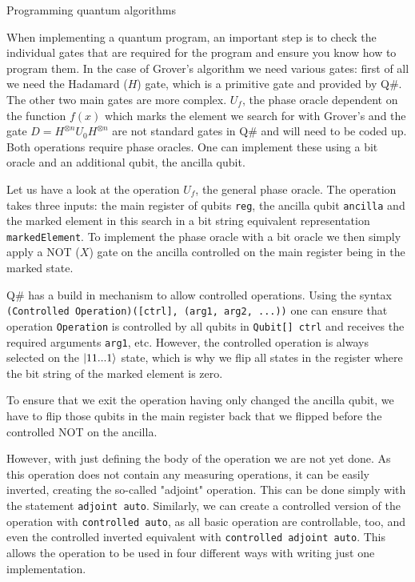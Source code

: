 

Programming quantum algorithms

When implementing a quantum program, an important step is to check the individual gates that are required for the program and ensure you know how to program them. In the case of Grover's algorithm we need various gates: first of all we need the Hadamard ($H$) gate, which is a primitive gate and provided by Q\#. The other two main gates are more complex. $U_f$, the phase oracle dependent on the function $f(x)$ which marks the element we search for with Grover's and the gate $D = H^{\otimes n} U_0 H^{\otimes n}$ are not standard gates in Q\# and will need to be coded up. Both operations require phase oracles. One can implement these using a bit oracle and an additional qubit, the ancilla qubit.

Let us have a look at the operation $U_f$, the general phase oracle. The operation takes three inputs: the main register of qubits \texttt{reg}, the ancilla qubit \texttt{ancilla} and the marked element in this search in a bit string equivalent representation \texttt{markedElement}.
To implement the phase oracle with a bit oracle we then simply apply a NOT ($X$) gate on the ancilla controlled on the main register being in the marked state.

Q\# has a build in mechanism to allow controlled operations. Using the syntax \texttt{(Controlled Operation)([ctrl], (arg1, arg2, ...))} one can ensure that operation \texttt{Operation} is controlled by all qubits in \texttt{Qubit[] ctrl} and receives the required arguments \texttt{arg1}, etc. However, the controlled operation is always selected on the $\left\vert{11...1}\right\rangle$ state, which is why we flip all states in the register where the bit string of the marked element is zero.

To ensure that we exit the operation having only changed the ancilla qubit, we have to flip those qubits in the main register back that we flipped before the controlled NOT on the ancilla.

However, with just defining the body of the operation we are not yet done. As this operation does not contain any measuring operations, it can be easily inverted, creating the so-called "adjoint" operation. This can be done simply with the statement \texttt{adjoint auto}. Similarly, we can create a controlled version of the operation with \texttt{controlled auto}, as all basic operation are controllable, too, and even the controlled inverted equivalent with \texttt{controlled adjoint auto}. This allows the operation to be used in four different ways with writing just one implementation. 

